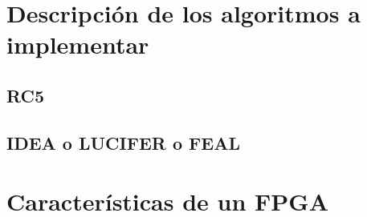 \section{Descripción de los algoritmos a implementar}
\subsection{RC5}


\subsection{IDEA o LUCIFER o FEAL}






\section{Características de un FPGA}



